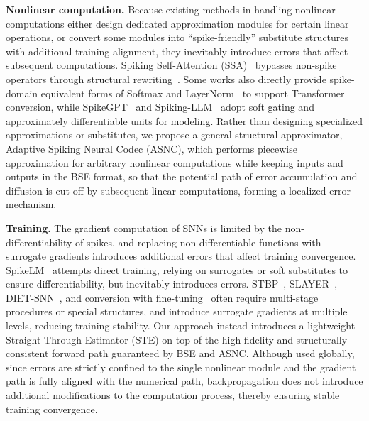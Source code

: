 \documentclass{article}
\theoremstyle{plain}
\theoremstyle{definition}
\theoremstyle{remark}
\begin{document}
\noindent\textbf{Nonlinear computation.} Because existing methods in handling nonlinear computations either design dedicated approximation modules for certain linear operations, or convert some modules into ``spike-friendly'' substitute structures with additional training alignment, they inevitably introduce errors that affect subsequent computations. Spiking Self-Attention (SSA)~\citep{zhou2023spikformer} bypasses non-spike operators through structural rewriting~\citep{yao2023sdt,spikedattention2024,wang2023stsa}. Some works also directly provide spike-domain equivalent forms of Softmax and LayerNorm~\citep{you2024spikeziptf,tang2024sorbet} to support Transformer conversion, while SpikeGPT~\citep{zhu2023spikegpt} and Spiking-LLM~\citep{xing2025spikellm} adopt soft gating and approximately differentiable units for modeling. Rather than designing specialized approximations or substitutes, we propose a general structural approximator, Adaptive Spiking Neural Codec (ASNC), which performs piecewise approximation for arbitrary nonlinear computations while keeping inputs and outputs in the BSE format, so that the potential path of error accumulation and diffusion is cut off by subsequent linear computations, forming a localized error mechanism.  


\noindent\textbf{Training.} The gradient computation of SNNs is limited by the non-differentiability of spikes, and replacing non-differentiable functions with surrogate gradients introduces additional errors that affect training convergence. SpikeLM~\citep{xing2024spikelm} attempts direct training, relying on surrogates or soft substitutes to ensure differentiability, but inevitably introduces errors. STBP~\citep{wu2018stbp}, SLAYER~\citep{shrestha2018slayer}, DIET-SNN~\citep{rathi2021dietsnn}, and conversion with fine-tuning~\citep{rathi2020hybrid} often require multi-stage procedures or special structures, and introduce surrogate gradients at multiple levels, reducing training stability. Our approach instead introduces a lightweight Straight-Through Estimator (STE) on top of the high-fidelity and structurally consistent forward path guaranteed by BSE and ASNC. Although used globally, since errors are strictly confined to the single nonlinear module and the gradient path is fully aligned with the numerical path, backpropagation does not introduce additional modifications to the computation process, thereby ensuring stable training convergence.
\end{document}
